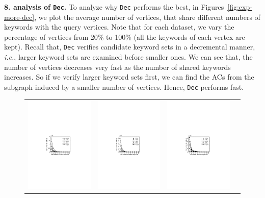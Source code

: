 \textbf{8. analysis of {\tt Dec}.}
To analyze why {\tt Dec} performs the best, in Figures~\ref{fig:exp-more-dec}, we plot the average number of vertices, that share different numbers of keywords with the query vertices. Note that for each dataset,  we vary the percentage of vertices from 20\% to 100\% (all the keywords of each vertex are kept). Recall that, {\tt Dec} verifies candidate keyword sets in a decremental manner, \textit{i.e.}, larger keyword sets are examined before smaller ones. We can see that, the number of vertices decreases very fast as the number of shared keywords increases. So if we verify larger keyword sets first,
we can find the ACs from the subgraph induced by a smaller number of vertices. Hence, {\tt Dec} performs fast.


\begin{figure}[htb]
\setlength{\abovecaptionskip}{0.cm}
\setlength{\belowcaptionskip}{-1cm}
\hspace*{-.4cm}
\centering
\begin{tabular}{c c c c}
  \begin{minipage}{3.36cm}
	\includegraphics[width=3.325cm]{figures/flickr-share}
  \end{minipage}
  &
  \begin{minipage}{3.36cm}
	\includegraphics[width=3.325cm]{figures/dblp-share}
  \end{minipage}
  &
  \begin{minipage}{3.36cm}
	\includegraphics[width=3.325cm]{figures/tencent-share}

\end{minipage}
\end{tabular}
\end{figure}
